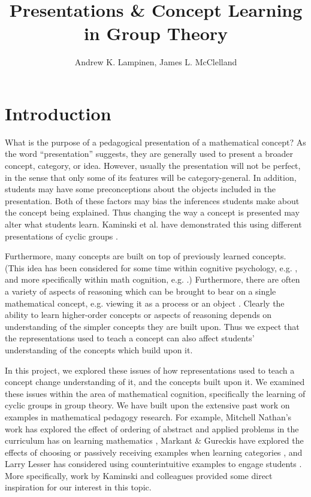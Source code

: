 \documentclass[man,10pt]{apa6}
\title{Presentations \& Concept Learning in Group Theory}
\author{Andrew K. Lampinen, James L. McClelland}
\affiliation{Department of Psychology, Stanford University}
\date{}
\begin{document}
\maketitle
\section{Introduction}
What is the purpose of a pedagogical presentation of a mathematical concept? As the word ``presentation'' suggests, they are generally used to present a broader concept, category, or idea. However, usually the presentation will not be perfect, in the sense that only some of its features will be category-general. In addition, students may have some preconceptions about the objects included in the presentation. Both of these factors may bias the inferences students make about the concept being explained. Thus changing the way a concept is presented may alter what students learn. Kaminski et al. have demonstrated this using different presentations of cyclic groups \cite{Kaminski2008}. \par
Furthermore, many concepts are built on top of previously learned concepts. (This idea has been considered for some time within cognitive psychology, e.g. \cite{Fischer1980}, and more specifically within math cognition, e.g. \cite{Hazzan1999}.) Furthermore, there are often a variety of aspects of reasoning which can be brought to bear on a single mathematical concept, e.g. viewing it as a process or an object \cite{Hazzan1999,Dubinsky1991}. Clearly the ability to learn higher-order concepts or aspects of reasoning depends on understanding of the simpler concepts they are built upon. Thus we expect that the representations used to teach a concept can also affect students' understanding of the concepts which build upon it.\par
In this project, we explored these issues of how representations used to teach a concept change understanding of it, and the concepts built upon it. We examined these issues within the area of mathematical cognition, specifically the learning of cyclic groups in group theory. We have built upon the extensive past work on examples in mathematical pedagogy research. For example, Mitchell Nathan's work has explored the effect of ordering of abstract and applied problems in the curriculum has on learning mathematics \cite{Nathan2012}, Markant \& Gureckis have explored the effects of choosing or passively receiving examples when learning categories \cite{Markant2014}, and Larry Lesser has considered using counterintuitive examples to engage students \cite{Lesser1998}. More specifically, work by Kaminski and colleagues provided some direct inspiration for our interest in this topic. 
\end{document}
